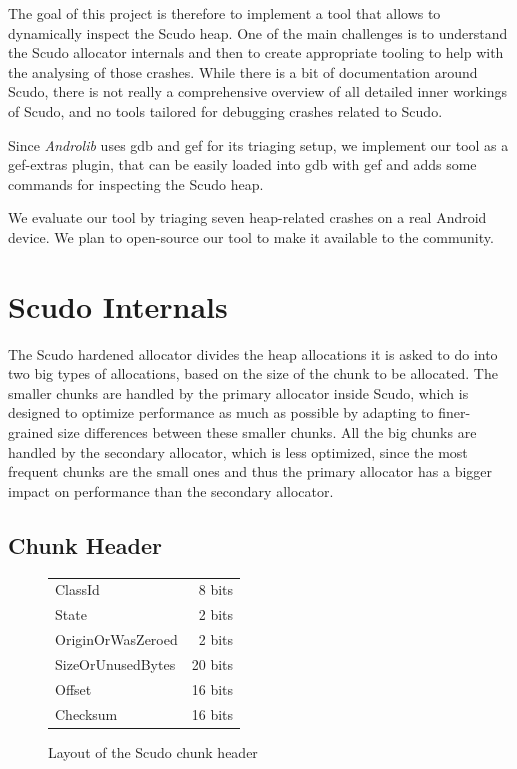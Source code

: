 \documentclass[a4paper,11pt,oneside]{report}
\begin{document}
The goal of this project is therefore to implement a tool that allows to dynamically 
inspect the Scudo heap. 
One of the main challenges is 
to understand the Scudo allocator internals and then to
create appropriate tooling to help with the analysing of those crashes.
While there is a bit of documentation around Scudo, there is not really a
comprehensive overview of all detailed inner workings of Scudo, and no 
tools tailored for debugging crashes related to Scudo.

Since \textit{Androlib} uses gdb and gef for its triaging setup, we implement our tool as a gef-extras plugin, 
that can be easily loaded into gdb with gef and adds some commands for inspecting the
Scudo heap.
 
We evaluate our tool by triaging seven heap-related crashes on a real Android 
device.
We plan to open-source our tool to make it available to the community.

\chapter{Scudo Internals}

The Scudo hardened allocator divides the heap allocations it is asked to do into
two big types of allocations, based on the size of the chunk to be allocated.
The smaller chunks are handled by the primary allocator inside Scudo, which is
designed to optimize performance as much as possible by adapting to finer-grained
size differences between these smaller chunks. All the big chunks are handled by
the secondary allocator, which is less optimized, since the most frequent chunks
are the small ones and thus the primary allocator has a bigger impact on performance
than the secondary allocator.

\section{Chunk Header}

\begin{figure}[h]
  \centering
  \begin{tabular}{|l|r|}
    \hline
    ClassId           & 8 bits  \\
    State             & 2 bits  \\
    OriginOrWasZeroed & 2 bits  \\
    SizeOrUnusedBytes & 20 bits \\
    Offset            & 16 bits \\
    Checksum          & 16 bits \\
    \hline
  \end{tabular}
  \caption{Layout of the Scudo chunk header}
  \label{fig:ScudoChunkHeader}
\end{figure}
\end{document}
